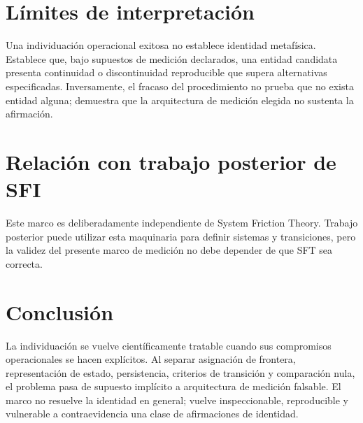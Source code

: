 \documentclass[11pt]{article}
\begin{document}
\section{Límites de interpretación}
Una individuación operacional exitosa no establece identidad metafísica. Establece que, bajo supuestos de medición declarados, una entidad candidata presenta continuidad o discontinuidad reproducible que supera alternativas especificadas. Inversamente, el fracaso del procedimiento no prueba que no exista entidad alguna; demuestra que la arquitectura de medición elegida no sustenta la afirmación.

\section{Relación con trabajo posterior de SFI}
Este marco es deliberadamente independiente de System Friction Theory. Trabajo posterior puede utilizar esta maquinaria para definir sistemas y transiciones, pero la validez del presente marco de medición no debe depender de que SFT sea correcta.

\section{Conclusión}
La individuación se vuelve científicamente tratable cuando sus compromisos operacionales se hacen explícitos. Al separar asignación de frontera, representación de estado, persistencia, criterios de transición y comparación nula, el problema pasa de supuesto implícito a arquitectura de medición falsable. El marco no resuelve la identidad en general; vuelve inspeccionable, reproducible y vulnerable a contraevidencia una clase de afirmaciones de identidad.
\end{document}
